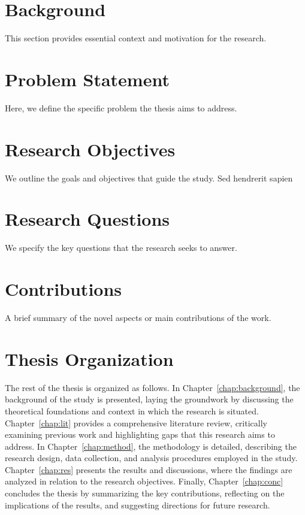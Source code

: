 \documentclass{uethesis}
\begin{document}
\section{Background}
This section provides essential context and motivation for the research. 

\section{Problem Statement}
Here, we define the specific problem the thesis aims to address. 

\section{Research Objectives}
We outline the goals and objectives that guide the study. Sed hendrerit sapien 

\section{Research Questions}
We specify the key questions that the research seeks to answer. 

\section{Contributions}
A brief summary of the novel aspects or main contributions of the work. 

\section{Thesis Organization}
The rest of the thesis is organized as follows. In Chapter~\ref{chap:background}, the background of the study is presented, laying the groundwork by discussing the theoretical foundations and context in which the research is situated. Chapter~\ref{chap:lit} provides a comprehensive literature review, critically examining previous work and highlighting gaps that this research aims to address. In Chapter~\ref{chap:method}, the methodology is detailed, describing the research design, data collection, and analysis procedures employed in the study. Chapter~\ref{chap:res} presents the results and discussions, where the findings are analyzed in relation to the research objectives. Finally, Chapter~\ref{chap:conc} concludes the thesis by summarizing the key contributions, reflecting on the implications of the results, and suggesting directions for future research.


\end{document}
